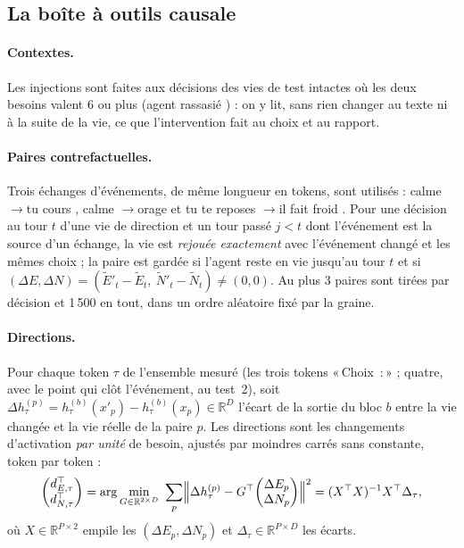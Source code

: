 \documentclass[11pt,a4paper]{article}
\newcommand{\Choix}{«\,Choix~:\,»}
\begin{document}
\subsection{La boîte à outils causale}
\label{sec-toolkit}

\paragraph{Contextes.} Les injections sont faites aux décisions des vies de test
intactes où les deux besoins valent 6 ou plus (\og agent rassasié \fg{}) : on y
lit, sans rien changer au texte ni à la suite de la vie, ce que l'intervention
fait au choix et au rapport.

\paragraph{Paires contrefactuelles.} Trois échanges d'événements, de même longueur
en tokens, sont utilisés : \og calme \fg{}$\to$\og tu cours \fg{},
\og calme \fg{}$\to$\og orage \fg{} et \og tu te reposes \fg{}$\to$\og il fait
froid \fg{}. Pour une décision au tour $t$ d'une vie de direction et un tour
passé $j<t$ dont l'événement est la source d'un échange, la vie est
\emph{rejouée exactement} avec l'événement changé et les mêmes choix ; la paire
est gardée si l'agent reste en vie jusqu'au tour $t$ et si
$(\Delta E,\Delta N)=(\tilde E'_t-\tilde E_t,\ \tilde N'_t-\tilde N_t)\ne(0,0)$.
Au plus 3 paires sont tirées par décision et 1\,500 en tout, dans un ordre
aléatoire fixé par la graine.

\paragraph{Directions.} Pour chaque token $\tau$ de l'ensemble mesuré (les trois
tokens \Choix{} ; quatre, avec le point qui clôt l'événement, au test~2), soit
$\Delta h^{(p)}_\tau=h^{(b)}_\tau(x'_p)-h^{(b)}_\tau(x_p)\in\mathbb R^{D}$ l'écart de
la sortie du bloc $b$ entre la vie changée et la vie réelle de la paire $p$.
Les directions sont les changements d'activation \emph{par unité} de besoin,
ajustés par moindres carrés sans constante, token par token :
\begin{equation}
\begin{pmatrix} d_{E,\tau}^{\top}\\ d_{N,\tau}^{\top}\end{pmatrix}
=\arg\min_{G\in\mathbb R^{2\times D}}\ \sum_{p}\Bigl\lVert \Delta h^{(p)}_\tau
- G^{\top}\!\begin{pmatrix}\Delta E_p\\ \Delta N_p\end{pmatrix}\Bigr\rVert^2
=(X^\top X)^{-1}X^\top \Delta_\tau ,
\label{eq-fit}
\end{equation}
où $X\in\mathbb R^{P\times2}$ empile les $(\Delta E_p,\Delta N_p)$ et
$\Delta_\tau\in\mathbb R^{P\times D}$ les écarts.
\end{document}
